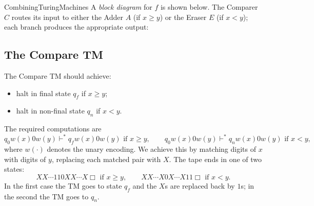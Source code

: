 \documentclass[hidelinks]{article}
\begin{document}
\begin{smodule}[title={Further Turing Machine Models, and Combining Turing Machines}]{CombiningTuringMachines}
A \emph{block diagram} for $f$ is shown below. The Comparer $C$ routes its input to either the Adder $A$ (if $x \geq y$) or the Eraser $E$ (if $x < y$); each branch produces the appropriate output:

\begin{center}
\end{center}

\subsection{The Compare TM}

The Compare TM should achieve:
\begin{itemize}
  \item halt in final state $q_f$ if $x \geq y$;
  \item halt in non-final state $q_n$ if $x < y$.
\end{itemize}
The required computations are
\[
q_0 w(x) 0 w(y) \vdash^* q_f w(x) 0 w(y) \text{ if } x \geq y, \qquad q_0 w(x) 0 w(y) \vdash^* q_n w(x) 0 w(y) \text{ if } x < y,
\]
where $w(\cdot)$ denotes the unary encoding. We achieve this by matching digits of $x$ with digits of $y$, replacing each matched pair with $X$. The tape ends in one of two states:
\[
XX\cdots1 1 0 X X \cdots X \Box \text{ if } x \geq y, \qquad XX \cdots X 0 X \cdots X 1 1 \Box \text{ if } x < y.
\]
In the first case the TM goes to state $q_f$ and the $X$s are replaced back by $1$s; in the second the TM goes to $q_n$.


\end{smodule}
\end{document}
